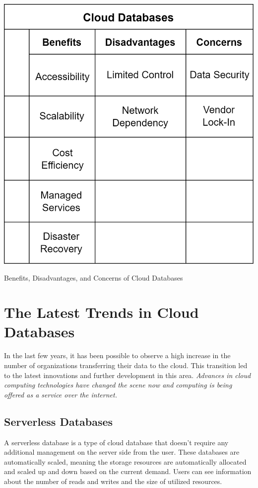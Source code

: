 \documentclass[12pt, a4paper]{article}
\begin{document}
    \begin{table}[t]
        \centering
        \includegraphics[width=0.65\linewidth]{images/benefits.png}
        \caption{Benefits, Disadvantages, and Concerns of Cloud Databases}
        \label{tab:benefits}
    \end{table}
\clearpage

\section{The Latest Trends in Cloud Databases}
    In the last few years, it has been possible to observe a high increase in the number of organizations transferring their data to the cloud. This transition led to the latest innovations and further development in this area. \textit{Advances in cloud computing technologies have changed the scene now and computing is being offered as a service over the internet.}\cite{09}
    
    \subsection{Serverless Databases}
        A serverless database is a type of cloud database that doesn't require any additional management on the server side from the user. These databases are automatically scaled, meaning the storage resources are automatically allocated and scaled up and down based on the current demand. Users can see information about the number of reads and writes and the size of utilized resources.
    
\end{document}
